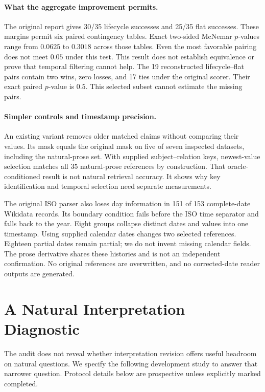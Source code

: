 \documentclass[11pt]{article}
\begin{document}
\paragraph{What the aggregate improvement permits.}
The original report gives 30/35 lifecycle successes and 25/35 flat successes.
These margins permit six paired contingency tables.
Exact two-sided McNemar $p$-values range from $0.0625$ to $0.3018$ across those tables.
Even the most favorable pairing does not meet $0.05$ under this test.
This result does not establish equivalence or prove that temporal filtering cannot help.
The 19 reconstructed lifecycle--flat pairs contain two wins, zero losses, and 17 ties under the original scorer.
Their exact paired $p$-value is $0.5$.
This selected subset cannot estimate the missing pairs.

\paragraph{Simpler controls and timestamp precision.}
An existing variant removes older matched claims without comparing their values.
Its mask equals the original mask on five of seven inspected datasets, including the natural-prose set.
With supplied subject--relation keys, newest-value selection matches all 35 natural-prose references by construction.
That oracle-conditioned result is not natural retrieval accuracy.
It shows why key identification and temporal selection need separate measurements.

The original ISO parser also loses day information in 151 of 153 complete-date Wikidata records.
Its boundary condition fails before the ISO time separator and falls back to the year.
Eight groups collapse distinct dates and values into one timestamp.
Using supplied calendar dates changes two selected references.
Eighteen partial dates remain partial; we do not invent missing calendar fields.
The prose derivative shares these histories and is not an independent confirmation.
No original references are overwritten, and no corrected-date reader outputs are generated.

\section{A Natural Interpretation Diagnostic}
\label{sec:diagnostic}

The audit does not reveal whether interpretation revision offers useful headroom on natural questions.
We specify the following development study to answer that narrower question.
Protocol details below are prospective unless explicitly marked completed.
\end{document}
